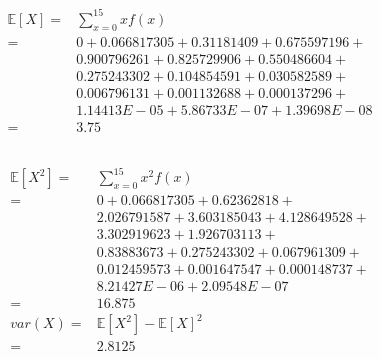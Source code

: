 \documentclass{article}
\begin{document}
        \subsection{}
            \subsubsection{}
                \begin{equation*}
                    \begin{split}
                        \mathbb{E}[X]=&\sum_{x=0}^15 xf(x)\\
                            =&0+0.066817305+
                            0.31181409+
                            0.675597196+\\
                            &0.900796261+
                            0.825729906+
                            0.550486604+\\
                            &0.275243302+
                            0.104854591+
                            0.030582589+\\
                            &0.006796131+
                            0.001132688+
                            0.000137296+\\
                            &1.14413E-05+
                            5.86733E-07+
                            1.39698E-08\\
                            =&3.75\\
                    \end{split}
                \end{equation*}
            \subsubsection{}
                \begin{equation*}
                    \begin{split}
                        \mathbb{E}[X^2]=&\sum_{x=0}^15 x^2f(x)\\
                            =&0+
                            0.066817305+
                            0.62362818+\\&
                            2.026791587+
                            3.603185043+
                            4.128649528+\\&
                            3.302919623+
                            1.926703113+\\&
                            0.83883673+
                            0.275243302+
                            0.067961309+\\&
                            0.012459573+
                            0.001647547+
                            0.000148737+\\&
                            8.21427E-06+
                            2.09548E-07\\
                            =&16.875  \\
                        var(X)=&\mathbb{E}[X^2]-\mathbb{E}[X]^2\\
                            =&2.8125              
                    \end{split}
                \end{equation*}
\end{document}
